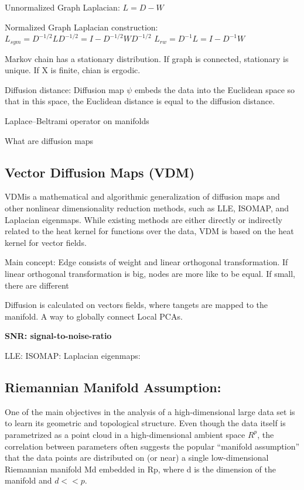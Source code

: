 Unnormalized Graph Laplacian:
$L = D - W$

Normalized Graph Laplacian construction:
$L_{sym} = D^{-1/2}LD^{-1/2} = I - D^{-1/2}WD^{-1/2} $
$L_{rw} = D^{-1}L = I - D^{-1}W $

Markov chain has a stationary distribution.
If graph is connected, stationary is unique.
If X is finite, chian is ergodic.

Diffusion distance:
Diffusion map $\psi$ embeds the data into the Euclidean space so that in this space, the Euclidean
distance is equal to the diffusion distance.

Laplace–Beltrami operator on manifolds

What are diffusion maps

\subsection{Vector Diffusion Maps (VDM)}

\cite{vectorDiffusionMaps}
VDMis a mathematical and algorithmic generalization of diffusion maps
and other nonlinear dimensionality reduction methods, such as LLE, ISOMAP,
and Laplacian eigenmaps. While existing methods are either directly or indirectly
related to the heat kernel for functions over the data, VDM is based on
the heat kernel for vector fields.

Main concept:
Edge consists of weight and linear orthogonal transformation.
If linear orthogonal transformation is big, nodes are more like to be equal.
If small, there are different

Diffusion is calculated on vectors fields, where tangets are mapped to the manifold.
A way to globally connect Local PCAs.

\textbf{SNR: signal-to-noise-ratio}


LLE:
ISOMAP:
Laplacian eigenmaps:


\subsection{Riemannian Manifold Assumption:}
One of the main objectives in the analysis of a high-dimensional large data set
is to learn its geometric and topological structure. Even though the data itself is
parametrized as a point cloud in a high-dimensional ambient space $R^p$, the correlation
between parameters often suggests the popular “manifold assumption” that
the data points are distributed on (or near) a single low-dimensional Riemannian
manifold Md embedded in Rp, where d is the dimension of the manifold and
$d << p$.


